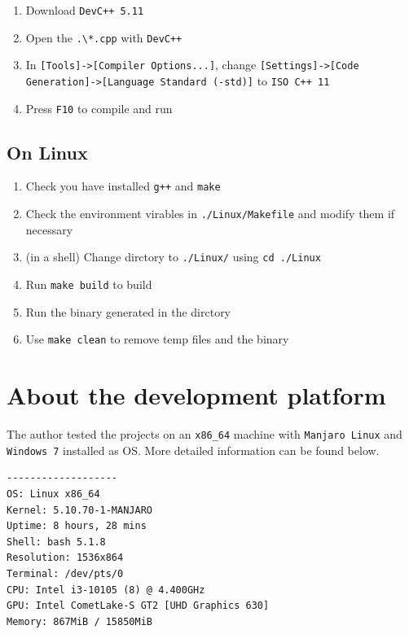 \documentclass[cn,black,12pt,normal]{elegantnote}
\begin{document}
\begin{enumerate}
    \item Download \lstinline{DevC++ 5.11}
    \item Open the \lstinline{.\*.cpp} with \lstinline{DevC++}
    \item In \lstinline{[Tools]->[Compiler Options...]}, change \lstinline{[Settings]->[Code Generation]->[Language Standard (-std)]} to \lstinline{ISO C++ 11}
    \item Press \lstinline{F10} to compile and run
\end{enumerate}



\subsection{On Linux}

\begin{enumerate}
    \item Check you have installed \lstinline{g++} and \lstinline{make}
    \item Check the environment virables in \lstinline{./Linux/Makefile} and modify them if necessary
    \item (in a shell) Change dirctory to \lstinline{./Linux/} using \lstinline{cd ./Linux}
    \item Run \lstinline{make build} to build
    \item Run the binary generated in the dirctory
    \item Use \lstinline{make clean} to remove temp files and the binary
\end{enumerate}

\section{About the development platform}

The author tested the projects on an \lstinline{x86_64} machine with \lstinline{Manjaro Linux} and \lstinline{Windows 7} installed as OS. More detailed information can be found below.

\begin{lstlisting}
-------------------
OS: Linux x86_64
Kernel: 5.10.70-1-MANJARO
Uptime: 8 hours, 28 mins
Shell: bash 5.1.8
Resolution: 1536x864
Terminal: /dev/pts/0
CPU: Intel i3-10105 (8) @ 4.400GHz
GPU: Intel CometLake-S GT2 [UHD Graphics 630]
Memory: 867MiB / 15850MiB
\end{lstlisting}
\end{document}
